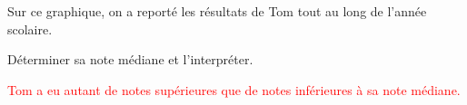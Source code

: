\begin{exercice*}
    Sur ce graphique, on a reporté les résultats de Tom tout au long de l'année scolaire.


    Déterminer sa note médiane et l'interpréter.
\end{exercice*}
\begin{corrige}
    \textcolor{red}{}

    \textcolor{red}{Tom a eu autant de notes supérieures que de notes inférieures à sa note médiane.}
\end{corrige}

